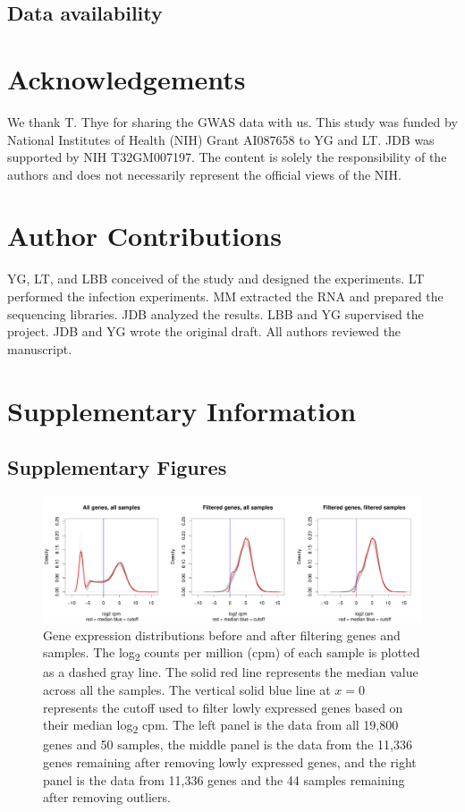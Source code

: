 \documentclass[fleqn,10pt]{wlscirep}
\newcommand{\beginsupplement}{%
 \setcounter{table}{0}
 \renewcommand{\thetable}{S\arabic{table}}%
 \setcounter{figure}{0}
 \renewcommand{\thefigure}{S\arabic{figure}}%
 }
\begin{document}
\subsection*{Data availability}

\section*{Acknowledgements}

We thank T. Thye for sharing the GWAS data with us. This study was
funded by National Institutes of Health (NIH) Grant AI087658 to YG and
LT. JDB was supported by NIH T32GM007197. The content is solely the
responsibility of the authors and does not necessarily represent the
official views of the NIH.
\section*{Author Contributions}

YG, LT, and LBB conceived of the study and designed the experiments.
LT performed the infection experiments. MM extracted the RNA and
prepared the sequencing libraries. JDB analyzed the results. LBB and
YG supervised the project. JDB and YG wrote the original draft. All
authors reviewed the manuscript.



\clearpage\newpage
\beginsupplement
\section*{Supplementary Information}

\subsection*{Supplementary Figures}


\begin{figure}[ht]
\centering
\includegraphics[width=\linewidth]{../figure/gene-exp-distribution.pdf}
\caption{
Gene expression distributions before and after filtering genes and
samples. The log\textsubscript{2} counts per million (cpm) of each
sample is plotted as a dashed gray line. The solid red line represents
the median value across all the samples. The vertical solid blue line
at $x = 0$ represents the cutoff used to filter lowly expressed genes
based on their median log\textsubscript{2} cpm. The left panel is the
data from all 19,800 genes and 50 samples, the middle panel is the
data from the 11,336 genes remaining after removing lowly expressed
genes, and the right panel is the data from 11,336 genes and the 44
samples remaining after removing outliers.
}
\label{fig:gene}
\end{figure}
\end{document}
